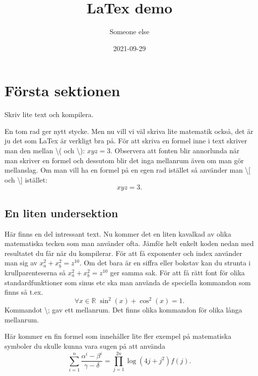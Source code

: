 \documentclass{article}
\title{LaTex demo}
\author{Someone else}
\date{2021-09-29}
\begin{document}
\maketitle


\section{Första sektionen}

Skriv lite text och kompilera.

En tom rad ger nytt stycke. Men nu vill vi väl skriva lite matematik också,
det är ju det som LaTex är verkligt bra på. För att skriva en formel inne i text
skriver man den mellan \textbackslash( och \textbackslash): \( x y z=3 \). Observera
att fonten blir annorlunda när man skriver en formel och dessutom blir det 
inga mellanrum även om man gör mellanslag. Om man vill ha en formel på en egen
rad istället så använder man  \textbackslash [ och \textbackslash ] istället:
\[
x y z = 3.
\]

\subsection{En liten undersektion}
Här finns en del intressant text. Nu kommer det en liten kavalkad av olika
matematiska tecken som man använder ofta. Jämför helt enkelt koden nedan med
resultatet du får när du kompilerar. För att få exponenter och index använder
man sig av \(x_{a}^{2} + x_{b}^{2} = z^{10}\). Om det bara är en siffra eller
bokstav kan du strunta i krullparenteserna så \(x_a^2 + x_b^2 = z^{10}\)
ger samma sak. För att få rätt font för olika standardfunktioner som sinus etc ska man använda de
speciella kommandon som finns så t.ex. 
\[
\forall x\in\mathbb{R}\; \sin^2(x)+\cos^2(x) = 1.
\]
Kommandot \textbackslash; gav ett mellanrum. Det finns olika kommandon för 
olika långa mellanrum.

Här kommer en fin formel som innehåller lite fler exempel på matematiska
symboler du skulle kunna vara sugen på att använda
\[
\sum_{i=1}^n \frac{\alpha^i-\beta^i}{\gamma - \delta} = \prod_{j=1}^{2n}
\log(4j + j^2) f(j).
\]

\tableofcontents
\end{document}
